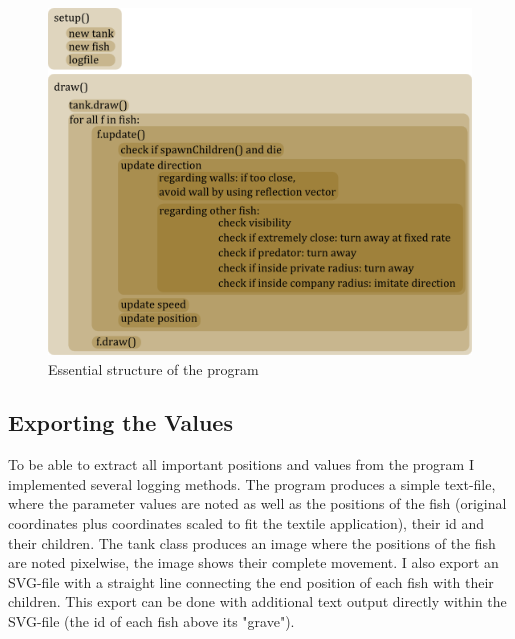 \documentclass{scrartcl}
\begin{document}
\begin{figure}[h]
        \centering
        \includegraphics[width=\textwidth]{implementationsketch}
        \caption{Essential structure of the program}
        
\end{figure}

\subsection{Exporting the Values}
To be able to extract all important positions and values from the program I implemented several logging methods. The program produces a simple text-file, where the parameter values are noted as well as the positions of the fish (original coordinates plus coordinates scaled to fit the textile application), their id and their children. The tank class produces an image where the positions of the fish are noted pixelwise, the image shows their complete movement. I also export an SVG-file with a straight line connecting the end position of each fish with their children. This export can be done with additional text output directly within the SVG-file (the id of each fish above its "grave").
\end{document}
